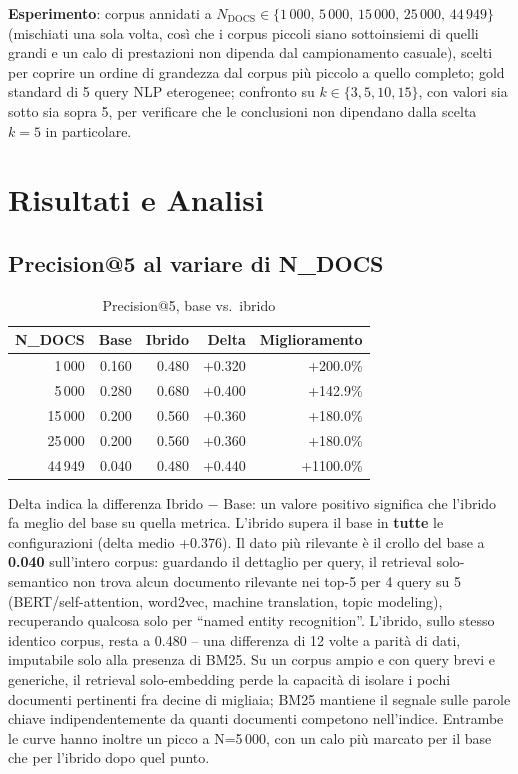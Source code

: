 \documentclass[12pt,a4paper]{article}
\begin{document}
\textbf{Esperimento}: corpus annidati a $N_{\text{DOCS}} \in \{1\,000,\,5\,000,\,15\,000,\,25\,000,\,44\,949\}$ (mischiati una sola volta, cos\`i che i corpus piccoli siano sottoinsiemi di quelli grandi e un calo di prestazioni non dipenda dal campionamento casuale), scelti per coprire un ordine di grandezza dal corpus pi\`u piccolo a quello completo; gold standard di 5 query NLP eterogenee; confronto su $k \in \{3, 5, 10, 15\}$, con valori sia sotto sia sopra 5, per verificare che le conclusioni non dipendano dalla scelta $k=5$ in particolare.

\section{Risultati e Analisi}
\label{sec:risultati}

\subsection{Precision@5 al variare di N\_DOCS}

\begin{table}[H]
  \centering
  \caption{Precision@5, base vs.\ ibrido}
  \begin{tabular}{rrrrr}
    \toprule
    \textbf{N\_DOCS} & \textbf{Base} & \textbf{Ibrido} & \textbf{Delta} & \textbf{Miglioramento} \\
    \midrule
    1\,000  & 0.160 & 0.480 & +0.320 & +200.0\% \\
    5\,000  & 0.280 & 0.680 & +0.400 & +142.9\% \\
    15\,000 & 0.200 & 0.560 & +0.360 & +180.0\% \\
    25\,000 & 0.200 & 0.560 & +0.360 & +180.0\% \\
    44\,949 & 0.040 & 0.480 & +0.440 & +1100.0\% \\
    \bottomrule
  \end{tabular}
\end{table}

Delta indica la differenza Ibrido $-$ Base: un valore positivo significa che l'ibrido fa meglio del base su quella metrica. L'ibrido supera il base in \textbf{tutte} le configurazioni (delta medio +0.376). Il dato pi\`u rilevante \`e il crollo del base a \textbf{0.040} sull'intero corpus: guardando il dettaglio per query, il retrieval solo-semantico non trova alcun documento rilevante nei top-5 per 4 query su 5 (BERT/self-attention, word2vec, machine translation, topic modeling), recuperando qualcosa solo per ``named entity recognition''. L'ibrido, sullo stesso identico corpus, resta a 0.480 -- una differenza di 12 volte a parit\`a di dati, imputabile solo alla presenza di BM25. Su un corpus ampio e con query brevi e generiche, il retrieval solo-embedding perde la capacit\`a di isolare i pochi documenti pertinenti fra decine di migliaia; BM25 mantiene il segnale sulle parole chiave indipendentemente da quanti documenti competono nell'indice. Entrambe le curve hanno inoltre un picco a N=5\,000, con un calo pi\`u marcato per il base che per l'ibrido dopo quel punto.
\end{document}
